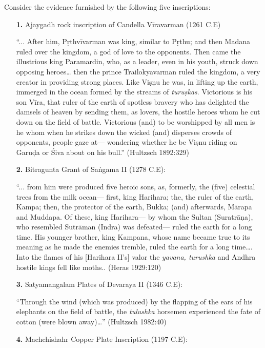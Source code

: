 Consider the evidence furnished by the following five inscriptions: 
\begin{itemize}
\itemsep=1pt
\item[{\bf 1.}] Ajaygadh rock inscription of Candella Vīravarman (1261 C.E) 

“... After him, Pṛthvīvarman was king, similar to Pṛthu; and then Madana ruled over the kingdom, a god of love to the opponents. Then came the illustrious king Paramardin, who, as a leader, even in his youth, struck down opposing heroes… then the prince Trailokyavarman ruled the kingdom, a very creator in providing strong places. Like Viṣṇu he was, in lifting up the earth, immerged in the ocean formed by the streams of {\sl turuṣkas}. Victorious is his son Vīra, that ruler of the earth of spotless bravery who has delighted the damsels of heaven by sending them, as lovers, the hostile heroes whom he cut down on the field of battle. Victorious (and) to be worshipped by all men is he whom when he strikes down the wicked (and) disperses crowds of opponents, people gaze at— wondering whether he be Viṣnu riding on Garuḍa or Śiva about on his bull.” 
\hfill (Hultzsch 1892:329)

\item[{\bf 2.}] Bitragunta Grant of Saṅgama II (1278 C.E): 

“... from him were produced five heroic sons, as, formerly, the (five) celestial trees from the milk ocean— first, king Harihara; the, the ruler of the earth, Kampa; then, the protector of the earth, Bukka; (and) afterwards, Mārapa and Muddapa. Of these, king Harihara— by whom the Sultan (Suratrāṇa), who resembled Sutrāman (Indra) was defeated— ruled the earth for a long time. His younger brother, king Kampana, whose name became true to its meaning as he made the enemies tremble, ruled the earth for a long time…. Into the flames of his [Harihara II’s] valor the {\sl yavana, turushka} and Andhra hostile kings fell like moths.. (Heras 1929:120) 

\item[{\bf 3.}] Satyamangalam Plates of Devaraya II (1346 C.E): 

“Through the wind (which was produced) by the flapping of the ears of his elephants on the field of battle, the {\sl tulushka} horsemen experienced the fate of cotton (were blown away)…” (Hultzsch 1982:40)

\item[{\bf 4.}] Machchishahr Copper Plate Inscription (1197 C.E): 


\end{itemize}
